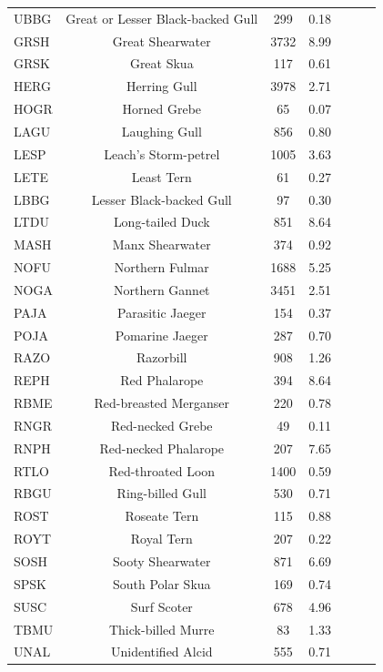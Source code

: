 \documentclass{statsoc}
\begin{document}
{\begin{longtable}{| l | c | c | c | c | c | c | }
UBBG &  Great or Lesser Black-backed Gull & 299 & 0.18 &  &   &  \\ 
GRSH &  Great Shearwater & 3732 & 8.99 &  &  &   \\ 
GRSK &  Great Skua & 117 & 0.61 &  &  & \\ 
HERG &  Herring Gull & 3978 & 2.71 &  &  &  \\ 
HOGR &  Horned Grebe & 65 & 0.07 &  &  &  \\ 
LAGU &  Laughing Gull & 856  & 0.80 &  &   &  \\ 
LESP &  Leach's Storm-petrel & 1005 & 3.63 &  &  &  \\ 
LETE &  Least Tern & 61 & 0.27 &  &  &  \\ 
LBBG &  Lesser Black-backed Gull & 97 & 0.30 &  &  &  \\ 
LTDU &  Long-tailed Duck & 851 & 8.64 &  &  &    \\ 
MASH &  Manx Shearwater & 374 & 0.92 &  &  &    \\ 
NOFU &  Northern Fulmar & 1688 & 5.25 &  &  &   \\ 
NOGA &  Northern Gannet & 3451 & 2.51 &  &  &   \\ 
PAJA &  Parasitic Jaeger & 154 & 0.37 &  &  &   \\ 
POJA &  Pomarine Jaeger & 287 & 0.70 &  &  &   \\ 
RAZO &  Razorbill & 908 & 1.26 &  &  &   \\ 
REPH &  Red Phalarope & 394 & 8.64 &  &  &  \\ 
RBME &  Red-breasted Merganser & 220 & 0.78 &  &  &  \\ 
RNGR &  Red-necked Grebe & 49 & 0.11 &  &  &    \\ 
RNPH &  Red-necked Phalarope & 207 & 7.65 &  &  &    \\ 
RTLO &  Red-throated Loon & 1400 & 0.59 &  &  &   \\ 
RBGU &  Ring-billed Gull & 530 & 0.71 &  &  &   \\ 
ROST &  Roseate Tern & 115 & 0.88 &  &  &    \\ 
ROYT &  Royal Tern & 207 & 0.22 &  &  &    \\ 
SOSH &  Sooty Shearwater & 871 & 6.69 &  &  &   \\ 
SPSK &  South Polar Skua & 169 & 0.74  &  &  &  \\ 
SUSC &  Surf Scoter & 678 & 4.96 &  &  &   \\ 
TBMU &  Thick-billed Murre & 83 & 1.33 & &  &  \\ 
UNAL &  Unidentified Alcid & 555 & 0.71 &  &  &  \\ 

\end{longtable}}
\end{document}
